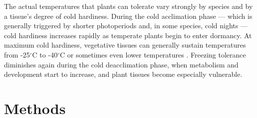 \documentclass{article}\usepackage[]{graphicx}\usepackage[]{color}
\begin{document}
  
  The actual temperatures that plants can tolerate vary strongly by species  and by a tissue's degree of cold hardiness. During the cold acclimation phase --- which is generally triggered by shorter photoperiods \citep{Howe2003, Charrier2011, Strimbeck2015, Welling1997} and, in some species, cold nights \citep{Charrier2011, Heide2005} --- cold hardiness increases rapidly as temperate plants begin to enter dormancy. At maximum cold hardiness, vegetative tissues can generally sustain temperatures from -25$^{\circ}$C to -40$^{\circ}$C \citep{Charrier2011,Korner2012,Vitasse2014} or sometimes even lower temperatures \citep[to -60$^{\circ}$C in extreme cases,][] {Korner2012}. Freezing tolerance diminishes again during the cold deacclimation phase, when metabolism and development start to increase, and plant tissues become especially vulnerable. 






\section*{Methods}
\end{document}
